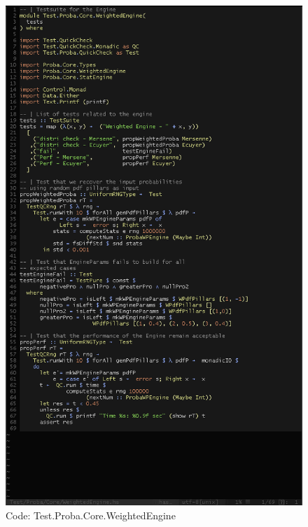 \documentclass[12pt,a4paper,titlepage]{article}
\begin{document}
\begin{figure}[h!]
\centering
\includegraphics[width=1\textwidth]{img/code-test-w.png}
\caption{Code: Test.Proba.Core.WeightedEngine }
\label{fig:test.w}
\end{figure}
\end{document}
